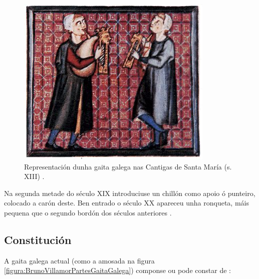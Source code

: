  \begin{figure}[htbp]
  \centering
  \includegraphics[scale=0.5,keepaspectratio=true]{./imagenes/cantigas-santa-maria-gaita-galega.jpg}
  \caption[Gaita galega nas Cantigas de Santa María]{Representación dunha gaita galega nas Cantigas de Santa María (s. XIII) \cite{WikipediaGaitaGalega}.}
  \label{figura:CantigasSantaMariaGaitaGalega}
 \end{figure}

 Na segunda metade do século XIX introduciuse un chillón como apoio ó punteiro,
 colocado a carón deste. Ben entrado o século XX apareceu unha ronqueta, máis
 pequena que o segundo bordón dos séculos anteriores
 \cite{WikipediaGaitaGalega}.

 \subsection{Constitución}

 A gaita galega actual (como a amosada na figura
 \ref{figura:BrunoVillamorPartesGaitaGalega}) componse ou pode constar de
 \cite{WikipediaGaitaGalega}:

